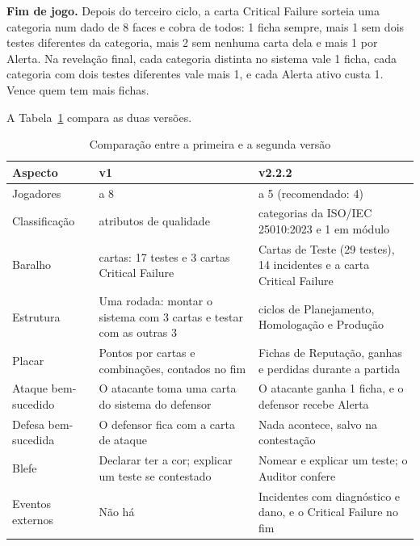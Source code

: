 \textbf{Fim de jogo.} Depois do terceiro ciclo, a carta Critical Failure sorteia uma categoria num dado de 8 faces
e cobra de todos: 1 ficha sempre, mais 1 sem dois testes diferentes da categoria, mais 2 sem nenhuma carta dela e
mais 1 por Alerta. Na revelação final, cada categoria distinta no sistema vale 1 ficha, cada categoria com dois
testes diferentes vale mais 1, e cada Alerta ativo custa 1. Vence quem tem mais fichas. 

A Tabela~\ref{tab:v1v2} compara as duas versões.

\begin{table}[ht]
  \centering
  \caption{Comparação entre a primeira e a segunda versão}
  \label{tab:v1v2}
  \footnotesize
  \begin{tabularx}{\linewidth}{>{\raggedright\arraybackslash}p{2.6cm} >{\raggedright\arraybackslash}X >{\raggedright\arraybackslash}X}
    \toprule
    Aspecto & v1 \cite{oliveira2025critical} & v2.2.2 \\
    \midrule
    Jogadores & 3 a 8 & 4 a 5 (recomendado: 4) \\
    Classificação & 6 atributos de qualidade & 7 categorias da ISO/IEC 25010:2023 e 1 em módulo \\
    Baralho & 54 cartas: 17 testes e 3 cartas Critical Failure & 63 Cartas de Teste (29 testes), 14 incidentes e a carta Critical Failure \\
    Estrutura & Uma rodada: montar o sistema com 3 cartas e testar com as outras 3 & 3 ciclos de Planejamento, Homologação e Produção \\
    Placar & Pontos por cartas e combinações, contados no fim & Fichas de Reputação, ganhas e perdidas durante a partida \\
    Ataque bem-sucedido & O atacante toma uma carta do sistema do defensor & O atacante ganha 1 ficha, e o defensor recebe Alerta \\
    Defesa bem-sucedida & O defensor fica com a carta de ataque & Nada acontece, salvo na contestação \\
    Blefe & Declarar ter a cor; explicar um teste se contestado & Nomear e explicar um teste; o Auditor confere \\
    Eventos externos & Não há & Incidentes com diagnóstico e dano, e o Critical Failure no fim \\
    \bottomrule
  \end{tabularx}
\end{table}

